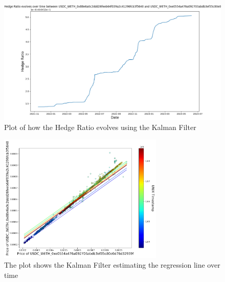 \begin{figure}[!htb]
    \centering
    \includegraphics[width=\textwidth]{project/Images/Evolving_hedge_ratio_kf.png}
    \caption{Plot of how the Hedge Ratio evolves using the Kalman Filter \label{fig:evolving_hedge_ratio_kf}}
\end{figure}
\vspace{-0.7cm}
\begin{figure}[!htb]
    \centering
    \includegraphics[width=0.7\textwidth]{project/Images/plots_1.png}
    \caption{The plot shows the Kalman Filter estimating the regression line over time\label{fig:ratios_kf}}
\end{figure}

